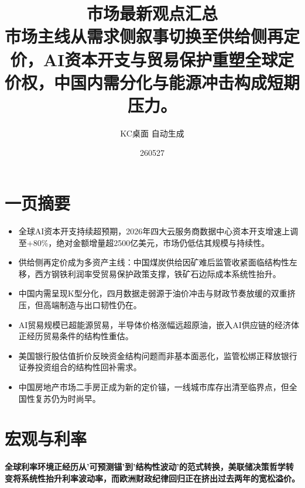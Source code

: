 \documentclass[11pt]{ctexart}
\title{\textbf{市场最新观点汇总}\\[0.4em]{\large 市场主线从需求侧叙事切换至供给侧再定价，AI资本开支与贸易保护重塑全球定价权，中国内需分化与能源冲击构成短期压力。}}
\author{KC桌面 自动生成}
\date{260527}
\begin{document}
\maketitle
\section*{一页摘要}
\begin{itemize}
  \item 全球AI资本开支持续超预期，2026年四大云服务商数据中心资本开支增速上调至+80\%，绝对金额增量超2500亿美元，市场仍低估其规模与持续性。
  \item 供给侧再定价成为多资产主线：中国煤炭供给因矿难后监管收紧面临结构性左移，西方钢铁利润率受贸易保护政策支撑，铁矿石边际成本系统性抬升。
  \item 中国内需呈现K型分化，四月数据走弱源于油价冲击与财政节奏放缓的双重挤压，但高端制造与出口韧性仍在。
  \item AI贸易规模已超能源贸易，半导体价格涨幅远超原油，嵌入AI供应链的经济体正经历贸易条件的结构性重估。
  \item 美国银行股估值折价反映资金结构问题而非基本面恶化，监管松绑正释放银行证券投资组合的结构性回补需求。
  \item 中国房地产市场二手房正成为新的定价锚，一线城市库存出清至临界点，但全国性复苏仍为时尚早。
\end{itemize}
\section{宏观与利率}
\textbf{全球利率环境正经历从'可预测锚'到'结构性波动'的范式转换，美联储决策哲学转变将系统性抬升利率波动率，而欧洲财政纪律回归正在挤出过去两年的宽松溢价。}
\end{document}
